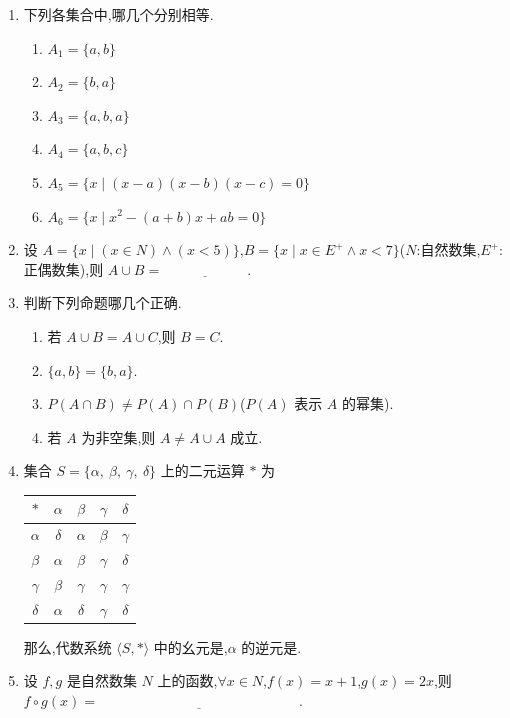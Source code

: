 \begin{enumerate}
	那么代数系统 $\langle A,\ast\rangle$ 的幺元是\underline{\hspace{3cm}},有逆元的元素为\underline{\hspace{3cm}},它们的逆元分别为\underline{\hspace{3cm}}.
	
	\item 下列各集合中,哪几个分别相等\underline{\hspace{3cm}}.
	\begin{enumerate}
		\item $A_1=\{a,b\}$
		\item $A_2=\{b,a\}$
		\item $A_3=\{a,b,a\}$
		\item $A_4=\{a,b,c\}$
		\item $A_5=\{x\mid (x-a)(x-b)(x-c)=0\}$
		\item $A_6=\{x\mid x^2-(a+b)x+ab=0\}$
	\end{enumerate}
	
	\item 设 $A=\{x\mid (x\in N)\land(x<5)\}$,$B=\{x\mid x\in E^{+}\land x<7\}$($N$:自然数集,$E^{+}$:正偶数集),则 $A\cup B=\underline{\qquad\qquad\qquad}$.
	
	
	\item 判断下列命题哪几个正确\underline{\hspace{3cm}}.
	\begin{enumerate}
		\item 若 $A\cup B=A\cup C$,则 $B=C$.
		\item $\{a,b\}=\{b,a\}$.
		\item $P(A\cap B)\neq P(A)\cap P(B)$($P(A)$ 表示 $A$ 的幂集).
		\item 若 $A$ 为非空集,则 $A\neq A\cup A$ 成立.
	\end{enumerate}
	
	
	\item 集合 $S=\{\alpha,\ \beta,\ \gamma,\ \delta\}$ 上的二元运算 $*$ 为
	\begin{table}[H]
		\centering
		\begin{tabular}{c|c|c|c|c}
			$*$ & $\alpha$ & $\beta$ & $\gamma$ & $\delta$ \\
			\hline
			$\alpha$ & $\delta$ & $\alpha$ & $\beta$ & $\gamma$ \\
			\hline
			$\beta$  & $\alpha$ & $\beta$  & $\gamma$ & $\delta$ \\
			\hline
			$\gamma$ & $\beta$  & $\gamma$ & $\gamma$ & $\gamma$ \\
			\hline
			$\delta$ & $\alpha$ & $\delta$ & $\gamma$ & $\delta$
		\end{tabular}
	\end{table}
	
	那么,代数系统 $\langle S,*\rangle$ 中的幺元是\underline{\hspace{3cm}},$\alpha$ 的逆元是\underline{\hspace{3cm}}.
	
	\item 设 \(f,g\) 是自然数集 \(N\) 上的函数,\(\forall x\in N\),\(f(x)=x+1\),\(g(x)=2x\),则 \(f\circ g(x)=\underline{\hspace{6cm}}\).
	
	
\end{enumerate}

